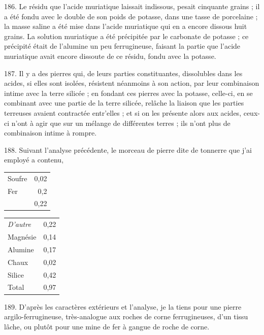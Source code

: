 \documentclass[a4paper, 11pt, oneside, polutonikogreek, french]{article}
\begin{document}
186. Le résidu que l'acide muriatique laissait indissous, pesait cinquante grains ; il a été fondu avec le double de son poids de potasse, dans une tasse de porcelaine ; la masse saline a été mise dans l'acide muriatique qui en a encore dissous huit grains. La solution muriatique a été précipitée par le carbonate de potasse ; ce précipité était de l'alumine un peu ferrugineuse, faisant la partie que l'acide muriatique avait encore dissoute de ce résidu, fondu avec la potasse.

187. Il y a des pierres qui, de leurs parties constituantes, dissolubles dans les acides, si elles sont isolées, résistent néanmoins à son action, par leur combinaison intime avec la terre silicée ; en fondant ces pierres avec la potasse, celle-ci, en se combinant avec une partie de la terre silicée, relâche la liaison que les parties terreuses avaient contractée entr'elles ; et si on les présente alors aux acides, ceux-ci n'ont à agir que sur un mélange de différentes terres ; ils n'ont plus de combinaison intime à rompre.

188. Suivant l'analyse précédente, le morceau de pierre dite de tonnerre que j'ai employé a contenu,

\begin{table}[!ht]
    \centering
    \bfseries
    \Fontauri
    \Large
    \begin{tabular}{l r}
        Soufre & 0,02 \\
        Fer & 0,2 \\ \hline
        ~ & 0,22 \\
    \end{tabular}
\end{table}

\begin{table}[!ht]
    \centering
    \bfseries
    \Fontauri
    \Large
    \begin{tabular}{l r}
        \emph{D'autre} & 0,22 \\
        Magnésie & 0,14 \\
        Alumine & 0,17 \\
        Chaux & 0,02 \\
        Silice & 0,42 \\ \hline
        Total & 0,97 \\
    \end{tabular}
\end{table}

189. D'après les caractères extérieurs et l'analyse, je la tiens pour une pierre argilo-ferrugineuse, très-analogue aux roches de corne ferrugineuses, d'un tissu lâche, ou plutôt pour une mine de fer à gangue de roche de corne.
\end{document}
